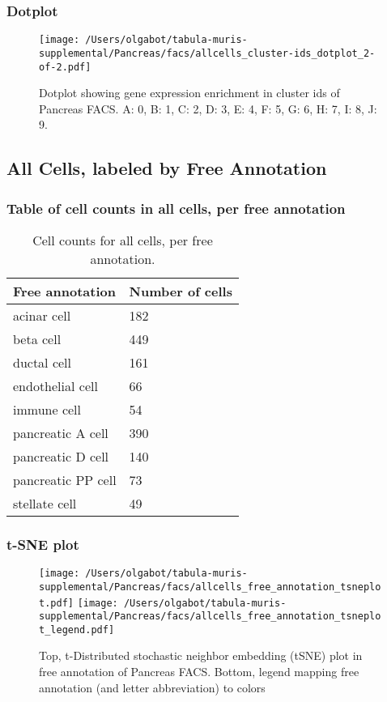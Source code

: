 \clearpage
\clearpage
\subsubsection{Dotplot}
\begin{figure}[h]
\centering
\texttt{[image: /Users/olgabot/tabula-muris-supplemental/Pancreas/facs/allcells\_cluster-ids\_dotplot\_2-of-2.pdf]}

\caption{ Dotplot  showing gene expression enrichment in cluster ids of Pancreas FACS. A: 0, B: 1, C: 2, D: 3, E: 4, F: 5, G: 6, H: 7, I: 8, J: 9.}
\end{figure}


\clearpage
\subsection{All Cells, labeled by Free Annotation}
\subsubsection{Table of cell counts in all cells, per free annotation}\begin{table}[h]
\centering
\label{my-label}
\begin{tabular}{@{}ll@{}}
\toprule

Free annotation& Number of cells \\ \midrule
acinar cell & 182 \\

beta cell & 449 \\

ductal cell & 161 \\

endothelial cell & 66 \\

immune cell & 54 \\

pancreatic A cell & 390 \\

pancreatic D cell & 140 \\

pancreatic PP cell & 73 \\

stellate cell & 49 \\
\bottomrule
\end{tabular}
\caption{Cell counts for all cells, per free annotation.}
\end{table}

\clearpage
\subsubsection{t-SNE plot}
\begin{figure}[h]
\centering
\texttt{[image: /Users/olgabot/tabula-muris-supplemental/Pancreas/facs/allcells\_free\_annotation\_tsneplot.pdf]}
\texttt{[image: /Users/olgabot/tabula-muris-supplemental/Pancreas/facs/allcells\_free\_annotation\_tsneplot\_legend.pdf]}
\caption{Top, t-Distributed stochastic neighbor embedding (tSNE) plot  in free annotation of Pancreas FACS. Bottom, legend mapping free annotation (and letter abbreviation) to colors}
\end{figure}


